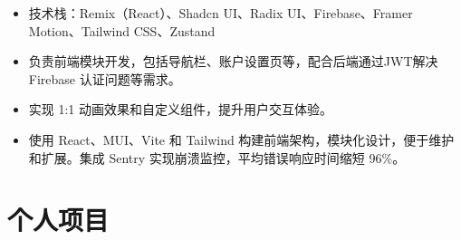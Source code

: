 \documentclass{resume}
\newcommand{\en}[1]{}
\newcommand{\zh}[1]{#1}
\begin{document}
\en{\datedsubsection{\textbf{\href{https://www.trychad.com/}{Chad}}}{}}
\zh{}
\en{\role{Front-End Engineer}{}}
\zh{}
\begin{itemize}
    \item \en{Tech stack: Remix (React), Shadcn UI, Radix UI, Firebase, Framer Motion, Tailwind CSS, Zustand}
          \zh{技术栈：Remix（React）、Shadcn UI、Radix UI、Firebase、Framer Motion、Tailwind CSS、Zustand}
    \item \en{Responsible for developing front-end modules, including navigation bar and account settings pages, and collaborating with the backend to address Firebase JWT authentication and related requirements.}
          \zh{负责前端模块开发，包括导航栏、账户设置页等，配合后端通过JWT解决 Firebase 认证问题等需求。}
    \item \en{Implemented pixel-perfect animations and custom components to enhance user interactions.}
          \zh{实现 1:1 动画效果和自定义组件，提升用户交互体验。}
    \item \en{Built a modular and scalable frontend architecture with React, MUI, Vite, and Tailwind CSS, integrating Sentry for crash monitoring (96\% faster incident response) and enabling rapid feature delivery, maintainability, and extensibility.}
          \zh{使用 React、MUI、Vite 和 Tailwind 构建前端架构，模块化设计，便于维护和扩展。集成 Sentry 实现崩溃监控，平均错误响应时间缩短 96\%。}
\end{itemize}

\section{\en{Portfolios}\zh{个人项目}}
\end{document}

